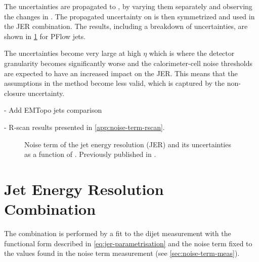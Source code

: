 The uncertainties are propagated to \Nfull, by varying them separately and observing the changes in \Nfull. The propagated uncertainty on \Nfull is then symmetrized and used in the JER combination. 
The results, including a breakdown of uncertainties, are shown in \cref{fig:noise-term-results-pflow} for PFlow jets.


%

The uncertainties become very large at high $\eta$ which is where the detector granularity becomes significantly worse and the calorimeter-cell noise thresholds are expected to have an increased impact on the JER. This means that the assumptions in the method become less valid, which is captured by the non-closure uncertainty. 


- Add EMTopo jets comparison

- R-scan results presented in \cref{app:noise-term-rscan}.



% 
% 

\begin{figure}
    \caption{Noise term of the jet energy resolution (JER) and its uncertainties as a function of \abseta. Previously published in .}
    \label{fig:noise-term-results-pflow}
\end{figure}



\section{Jet Energy Resolution Combination}

The combination is performed by a fit to the dijet measurement with the functional form described in \cref{eq:jer-parametrisation} and the noise term fixed to the values found in the noise term measurement (see \cref{sec:noise-term-meas}).


